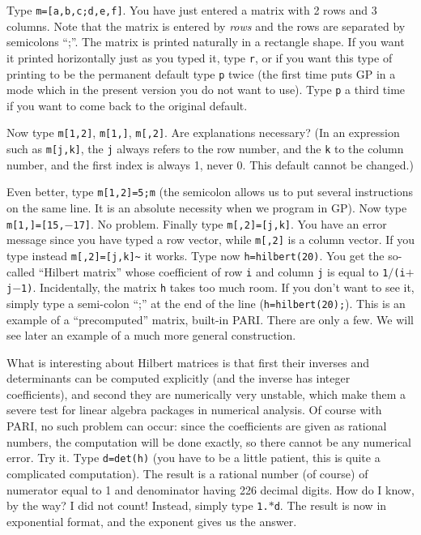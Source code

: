 Type {\tt m=[a,b,c;d,e,f]}. You have just entered a matrix with 2 rows and 3
columns. Note that the matrix is entered by {\sl rows\/} and the rows are
separated by semicolons ``;''. The matrix is printed naturally in a rectangle
shape. If you want it printed horizontally just as you typed it, type
{\tt \bs r}, or if you want this type of printing to be the permanent default
type {\tt \bs p} twice (the first time puts GP in a mode which in the present
version you do not want to use). Type {\tt \bs p} a third time if you want
to come back to the original default.

Now type {\tt m[1,2]}, {\tt m[1,]}, {\tt m[,2]}. Are explanations necessary?
(In an expression such as {\tt m[j,k]}, the {\tt j} always refers to the
row number, and the {\tt k} to the column number, and the first index is
always 1, never 0. This default cannot be changed.)

Even better, type {\tt m[1,2]=5;m} (the semicolon allows us to put several
instructions on the same line. It is an absolute necessity when we program
in GP). Now type {\tt m[1,]=[15,$-$17]}. No problem. Finally type
{\tt m[,2]=[j,k]}. You have an error message since you have typed a row
vector, while {\tt m[,2]} is a column vector. If you type instead
{\tt m[,2]=[j,k]\~{}} it works.
\smallskip
Type now {\tt h=hilbert(20)}. You get the so-called ``Hilbert matrix'' whose 
coefficient of row {\tt i} and column {\tt j} is equal to
{\tt 1$/$(i$+$j$-$1)}. Incidentally, the matrix {\tt h} takes too
much room. If you don't want to see it, simply type a semi-colon ``;'' at the
end of the line ({\tt h=hilbert(20);}). This is an example of a ``precomputed''
matrix, built-in PARI. There are only a few. We will see later an example
of a much more general construction.

What is interesting about Hilbert matrices is that first their inverses and
determinants can be computed explicitly (and the inverse has integer
coefficients), and second they are numerically very unstable, which make
them a severe test for linear algebra packages in numerical analysis.
Of course with PARI, no such problem can occur: since the coefficients are
given as rational numbers, the computation will be done exactly, so there
cannot be any numerical error. Try it. Type {\tt d=det(h)} (you have to be
a little patient, this is quite a complicated computation). The result is
a rational number (of course) of numerator equal to 1 and denominator having
226 decimal digits. How do I know, by the way? I did not count! Instead,
simply type {\tt 1.$*$d}. The result is now in exponential format, and the
exponent gives us the answer.

